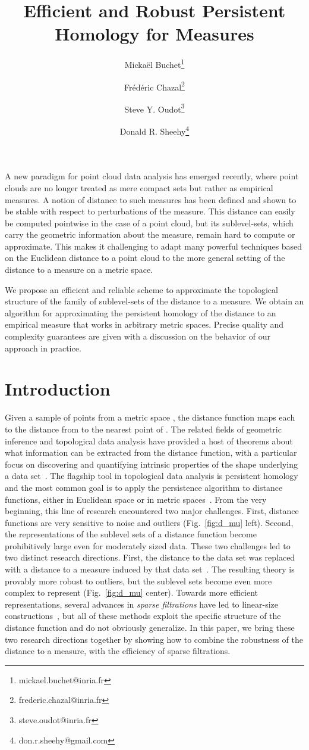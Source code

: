 \documentclass[a4paper]{article}
\title{Efficient and Robust Persistent Homology for Measures}
\author{
      Micka\"{e}l Buchet\footnote{mickael.buchet@inria.fr}
    \and
      Fr\'{e}d\'{e}ric Chazal\footnote{frederic.chazal@inria.fr}
    \and 
      Steve Y. Oudot\footnote{steve.oudot@inria.fr}
    \and
      Donald R. Sheehy\footnote{don.r.sheehy@gmail.com}
  }
\begin{document}
\maketitle

A new paradigm for point cloud data analysis has emerged recently, where point clouds are no longer treated as mere compact sets but rather as empirical measures. 
  A notion of distance to such measures has been defined and shown to be stable with respect to perturbations of the measure. 
  This distance can easily be computed pointwise in the case of a point cloud, but its sublevel-sets, which carry the geometric information about the measure, remain hard to compute or approximate.
  This makes it challenging to adapt many powerful techniques based on the Euclidean distance to a point cloud to the more general setting of the distance to a measure on a metric space.
 
  We propose an efficient and reliable scheme to approximate the topological structure of the family of sublevel-sets of the distance to a measure. 
  We obtain an algorithm for approximating the persistent homology of the distance to an empirical measure that works in arbitrary metric spaces. 
  Precise quality and complexity guarantees are given with a discussion on the behavior of our approach in practice.
 
\section{Introduction} Given a sample of points  from a metric space , the distance function  maps each  to the distance from  to the nearest point of .
  The related fields of geometric inference and topological data analysis have provided a host of theorems about what information can be extracted from the distance function, with a particular focus on discovering and quantifying intrinsic properties of the shape underlying a data set~\cite{stcsesCCL,fhshcrsNSW}.
  The flagship tool in topological data analysis is persistent homology and the most common goal is to apply the persistence algorithm to distance functions, either in Euclidean space or in metric spaces~\cite{carlsson09topology,tpsELZ, cphCZ}.
  From the very beginning, this line of research encountered two major challenges.
  First, distance functions are very sensitive to noise and outliers (Fig.~\ref{fig:d_mu} left).
  Second, the representations of the sublevel sets of a distance function become prohibitively large even for moderately sized data.
  These two challenges led to two distinct research directions.
  First, the distance to the data set was replaced with a distance to a measure induced by that data set~\cite{gipmCCM}.
  The resulting theory is provably more robust to outliers, but the sublevel sets become even more complex to represent (Fig.~\ref{fig:d_mu} center).
  Towards more efficient representations, several advances in \emph{sparse filtrations} have led to linear-size constructions~\cite{ctpsmDFW,ZZZ,lsavrfS}, but all of these methods exploit the specific structure of the distance function and do not obviously generalize.
  In this paper, we bring these two research directions together by showing how to combine the robustness of the distance to a measure, with the efficiency of sparse filtrations.
\end{document}
